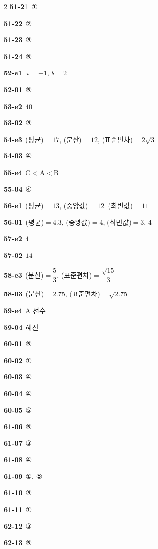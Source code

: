 \documentclass[10pt,a4paper]{article}
\newcommand{\pt}[1]{\mathrm{#1}}
\begin{document}
\begin{multicols}{2}
\noindent\textbf{51-21}\ ①\par
\noindent\textbf{51-22}\ ②\par
\noindent\textbf{51-23}\ ③\par
\noindent\textbf{51-24}\ ⑤\par
\noindent\textbf{52-e1}\ $a=-1$, $b=2$\par
\noindent\textbf{52-01}\ ⑤\par
\noindent\textbf{53-e2}\ $40$\par
\noindent\textbf{53-02}\ ③\par
\noindent\textbf{54-e3}\ (평균)$=17$, (분산)$=12$, (표준편차)$=2\sqrt{3}$\par
\noindent\textbf{54-03}\ ④\par
\noindent\textbf{55-e4}\ $\pt{C}<\pt{A}<\pt{B}$\par
\noindent\textbf{55-04}\ ④\par
\noindent\textbf{56-e1}\ (평균)$=13$, (중앙값)$=12$, (최빈값)$=11$\par
\noindent\textbf{56-01}\ (평균)$=4.3$, (중앙값)$=4$, (최빈값)$=3$, $4$\par
\noindent\textbf{57-e2}\ $4$\par
\noindent\textbf{57-02}\ $14$\par
\noindent\textbf{58-e3}\ (분산)$=\dfrac{5}{3}$, (표준편차)$=\dfrac{\sqrt{15}}{3}$\par
\noindent\textbf{58-03}\ (분산)$=2.75$, (표준편차)$=\sqrt{2.75}$\par
\noindent\textbf{59-e4}\ $\pt{A}$ 선수\par
\noindent\textbf{59-04}\ 혜진\par
\noindent\textbf{60-01}\ ⑤\par
\noindent\textbf{60-02}\ ①\par
\noindent\textbf{60-03}\ ④\par
\noindent\textbf{60-04}\ ④\par
\noindent\textbf{60-05}\ ⑤\par
\noindent\textbf{61-06}\ ⑤\par
\noindent\textbf{61-07}\ ③\par
\noindent\textbf{61-08}\ ④\par
\noindent\textbf{61-09}\ ①, ⑤\par
\noindent\textbf{61-10}\ ③\par
\noindent\textbf{61-11}\ ①\par
\noindent\textbf{62-12}\ ③\par
\noindent\textbf{62-13}\ ⑤\par

\end{multicols}
\end{document}
